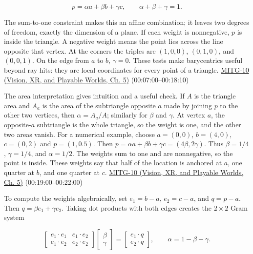\[
p=\alpha a+\beta b+\gamma c,\qquad \alpha+\beta+\gamma=1.
\]

The sum-to-one constraint makes this an affine combination; it leaves two degrees of freedom, exactly the dimension of a plane. If each weight is nonnegative, \(p\) is inside the triangle. A negative weight means the point lies across the line opposite that vertex. At the corners the triples are \((1,0,0)\), \((0,1,0)\), and \((0,0,1)\). On the edge from \(a\) to \(b\), \(\gamma=0\). These tests make barycentrics useful beyond ray hits: they are local coordinates for every point of a triangle. \href{../07-Vision-XR-and-Playable-Worlds/main.pdf\#nameddest=04-visual-computing-ii-ch036-mitg-10---ray-casting-ii}{MITG-10 (Vision, XR, and Playable Worlds, Ch. 5)} (00:07:00--00:18:10)

The area interpretation gives intuition and a useful check. If \(A\) is the triangle area and \(A_a\) is the area of the subtriangle opposite \(a\) made by joining \(p\) to the other two vertices, then \(\alpha=A_a/A\); similarly for \(\beta\) and \(\gamma\). At vertex \(a\), the opposite-\(a\) subtriangle is the whole triangle, so the weight is one, and the other two areas vanish. For a numerical example, choose \(a=(0,0)\), \(b=(4,0)\), \(c=(0,2)\) and \(p=(1,0.5)\). Then \(p=\alpha a+\beta b+\gamma c=(4\beta,2\gamma)\). Thus \(\beta=1/4\), \(\gamma=1/4\), and \(\alpha=1/2\). The weights sum to one and are nonnegative, so the point is inside. These weights say that half of the location is anchored at \(a\), one quarter at \(b\), and one quarter at \(c\). \href{../07-Vision-XR-and-Playable-Worlds/main.pdf\#nameddest=04-visual-computing-ii-ch036-mitg-10---ray-casting-ii}{MITG-10 (Vision, XR, and Playable Worlds, Ch. 5)} (00:19:00--00:22:00)

To compute the weights algebraically, set \(e_1=b-a\), \(e_2=c-a\), and \(q=p-a\). Then \(q=\beta e_1+\gamma e_2\). Taking dot products with both edges creates the \(2\times2\) Gram system

\[
\begin{bmatrix}e_1\cdot e_1&e_1\cdot e_2\\e_1\cdot e_2&e_2\cdot e_2\end{bmatrix}
\begin{bmatrix}\beta\\\gamma\end{bmatrix}=
\begin{bmatrix}e_1\cdot q\\e_2\cdot q\end{bmatrix},\qquad \alpha=1-\beta-\gamma.
\]

